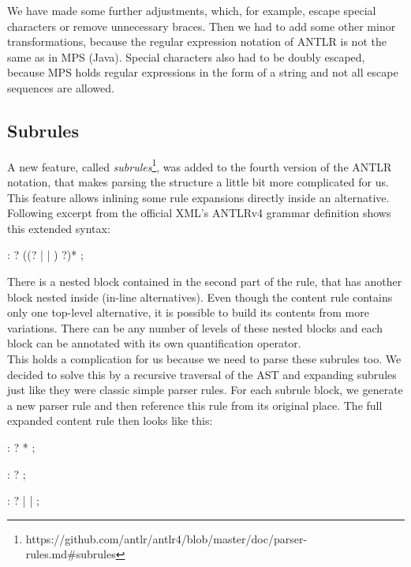 We have made some further adjustments, which, for example, escape special characters or remove unnecessary braces.
Then we had to add some other minor transformations, because the regular expression notation of ANTLR is not the same as in MPS (Java).
Special characters also had to be doubly escaped, because MPS holds regular expressions in the form of a string and not all escape sequences are allowed.

\subsection{Subrules}
\label{chap:subrules}

A new feature, called \textit{subrules}\footnote{https://github.com/antlr/antlr4/blob/master/doc/parser-rules.md\#subrules}, was added to the fourth version of the ANTLR notation, that makes parsing the structure a little bit more complicated for us.
This feature allows inlining some rule expansions directly inside an alternative.
Following excerpt from the official XML's ANTLRv4 grammar definition shows this extended syntax:

\begin{antlr}
	 :   ? ((? |  | ) ?)* ;
\end{antlr}

There is a nested block contained in the second part of the rule, that has another block nested inside (in-line alternatives).
Even though the content rule contains only one top-level alternative, it is possible to build its contents from more variations.
There can be any number of levels of these nested blocks and each block can be annotated with its own quantification operator.
\\

This holds a complication for us because we need to parse these subrules too.
We decided to solve this by a recursive traversal of the AST and expanding subrules just like they were classic simple parser rules.
For each subrule block, we generate a new parser rule and then reference this rule from its original place.
The full expanded content rule then looks like this:

\begin{antlr}
	 :   ? * ;

	 :    ? ;

	 :   ?
        |   
        |   
        ;
\end{antlr}
